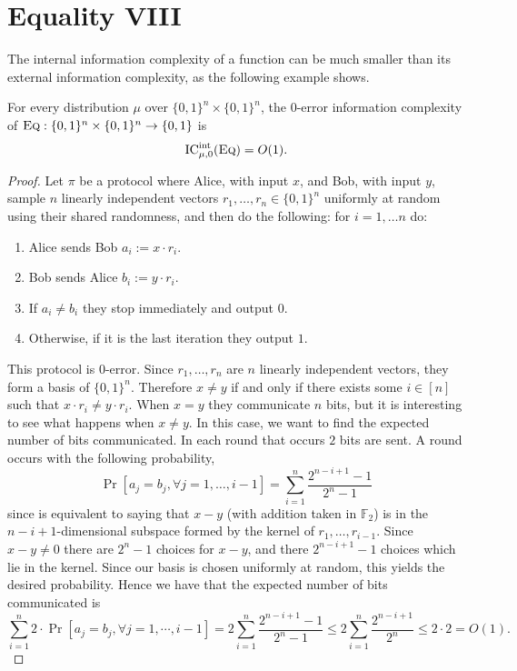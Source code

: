 \newpage 
\section{Equality VIII}

The internal information complexity of a function can be much smaller than its external information complexity, as the following example shows.

\begin{theorem}
For every distribution $\mu$ over $\{0,1\}^n \times \{0,1\}^n$, the $0$-error information complexity of $\textsc{Eq} : \{0,1\}^n \times \{0,1\}^n \to \{0,1\}$ is 
\[
\mathrm{IC}^{\mathrm{int}}_{\mu,0}(\textsc{Eq}) = O(1).
\]
\end{theorem}

\begin{proof}
Let $\pi$ be a protocol where Alice, with input $x$, and Bob, with input $y$, sample $n$ linearly independent vectors $r_1, \dots, r_n \in \{0,1\}^n$ uniformly at random using their shared randomness, and then do the following: for $i=1,\dots n$ do:
\begin{enumerate}
	\item Alice sends Bob $a_i:=x\cdot r_i$.
	\item Bob sends Alice $b_i:=y\cdot r_i$.
	\item If $a_i \neq b_i$ they stop immediately and output $0$.
	\item Otherwise, if it is the last iteration they output $1$.
\end{enumerate} 
This protocol is $0$-error. Since $r_1,\dots, r_n$ are $n$ linearly independent vectors, they form a basis of $\{0,1\}^n$. Therefore $x\neq y$ if and only if there exists some $i\in[n]$ such that $x\cdot r_i \neq y\cdot r_i$. When $x=y$ they communicate $n$ bits, but it is interesting to see what happens when $x\neq y$. In this case, we want to find the expected number of bits communicated. In each round that occurs $2$ bits are sent. A round occurs with the following probability,
$$\Pr[a_j = b_j, \forall j=1,\dots, i-1]=\sum_{i=1}^n\frac{2^{n-i+1}-1}{2^n-1}$$
since is equivalent to saying that $x-y$ (with addition taken in $\mathbb{F}_2$) is in the $n-i+1$-dimensional subspace formed by the kernel of $r_1,\dots,r_{i-1}$. Since $x-y\neq 0$ there are $2^n-1$ choices for $x-y$, and there $2^{n-i+1}-1$ choices which lie in the kernel. Since our basis is chosen uniformly at random, this yields the desired probability. Hence we have that the expected number of bits communicated is
$$\sum_{i=1}^n 2\cdot\Pr[a_j = b_j, \forall j=1,\cdots, i-1] = 2\sum_{i=1}^n\frac{2^{n-i+1}-1}{2^n-1}\leq 2\sum_{i=1}^n\frac{2^{n-i+1}}{2^n} \leq 2\cdot 2 = O(1).$$

\end{proof}
